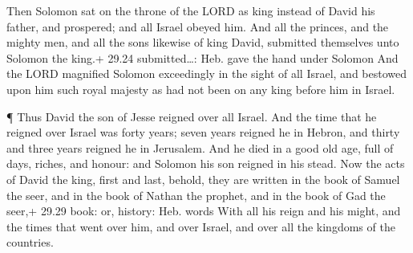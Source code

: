 Then Solomon sat on the throne of the LORD as king instead
of David his father, and prospered; and all Israel obeyed him.
 And all the princes, and the mighty men, and all the sons
likewise of king David, submitted themselves unto Solomon the king.+
29.24 submitted\ldots: Heb. gave the hand under Solomon 
And the LORD magnified Solomon exceedingly in the sight of all Israel,
and bestowed upon him such royal majesty as had not been on any king
before him in Israel.

 ¶ Thus David the son of Jesse reigned over all Israel.
 And the time that he reigned over Israel was forty years;
seven years reigned he in Hebron, and thirty and three years reigned he
in Jerusalem.  And he died in a good old age, full of days,
riches, and honour: and Solomon his son reigned in his stead.
 Now the acts of David the king, first and last, behold,
they are written in the book of Samuel the seer, and in the book of
Nathan the prophet, and in the book of Gad the seer,+ 29.29 book: or,
history: Heb. words  With all his reign and his might, and
the times that went over him, and over Israel, and over all the kingdoms
of the countries.
